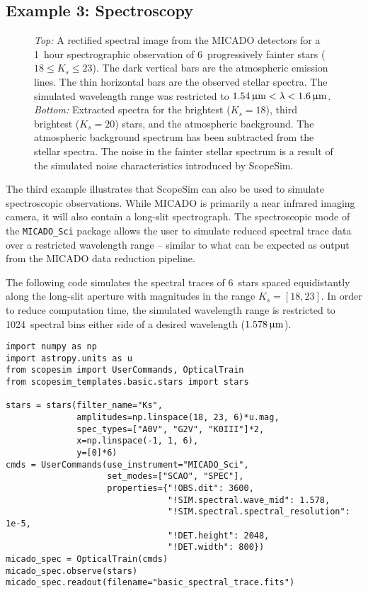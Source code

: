 \subsection{Example 3: Spectroscopy}
\label{example-3-spectroscopy}

\begin{figure}
  \begin{center}
    \caption{\textit{Top:} A rectified spectral image from the MICADO
      detectors for a 1~hour spectrographic observation of
      6~progressively fainter stars ($18\leq K_s\leq 23$).  The dark
      vertical bars are the atmospheric emission lines.  The thin
      horizontal bars are the observed stellar spectra.  The simulated
      wavelength range was restricted to
      $1.54\,\upmu\mathrm{m} < \lambda < 1.6\,\upmu\mathrm{m}$.  \textit{Bottom:}
      Extracted spectra for the brightest ($K_s=18$), third brightest
      ($K_s=20$) stars, and the atmospheric background.  The
      atmospheric background spectrum has been subtracted from the
      stellar spectra.  The noise in the fainter stellar spectrum is a
      result of the simulated noise characteristics introduced by
      ScopeSim.}
    \label{fig:example-3-spectra}
  \end{center}
\end{figure}

The third example illustrates that ScopeSim can also be used to
simulate spectroscopic observations.  While MICADO is primarily a near
infrared imaging camera, it will also contain a long-slit
spectrograph.  The spectroscopic mode of the \lstinline{MICADO_Sci}
package allows the user to simulate reduced spectral trace data over a
restricted wavelength range -- similar to what can be expected as
output from the MICADO data reduction pipeline.

The following code simulates the spectral traces of 6~stars spaced
equidistantly along the long-slit aperture with magnitudes in the
range $K_s=[18, 23]$.  In order to reduce computation time, the
simulated wavelength range is restricted to 1024~spectral bins either
side of a desired wavelength ($1.578\,\upmu\mathrm{m}$).

\begin{lstlisting}[frame=single]
import numpy as np
import astropy.units as u
from scopesim import UserCommands, OpticalTrain
from scopesim_templates.basic.stars import stars

stars = stars(filter_name="Ks",
              amplitudes=np.linspace(18, 23, 6)*u.mag,
              spec_types=["A0V", "G2V", "K0III"]*2,
              x=np.linspace(-1, 1, 6),
              y=[0]*6)
cmds = UserCommands(use_instrument="MICADO_Sci",
                    set_modes=["SCAO", "SPEC"],
                    properties={"!OBS.dit": 3600,
                                "!SIM.spectral.wave_mid": 1.578,
                                "!SIM.spectral.spectral_resolution": 1e-5,
                                "!DET.height": 2048,
                                "!DET.width": 800})
micado_spec = OpticalTrain(cmds)
micado_spec.observe(stars)
micado_spec.readout(filename="basic_spectral_trace.fits")
\end{lstlisting}

